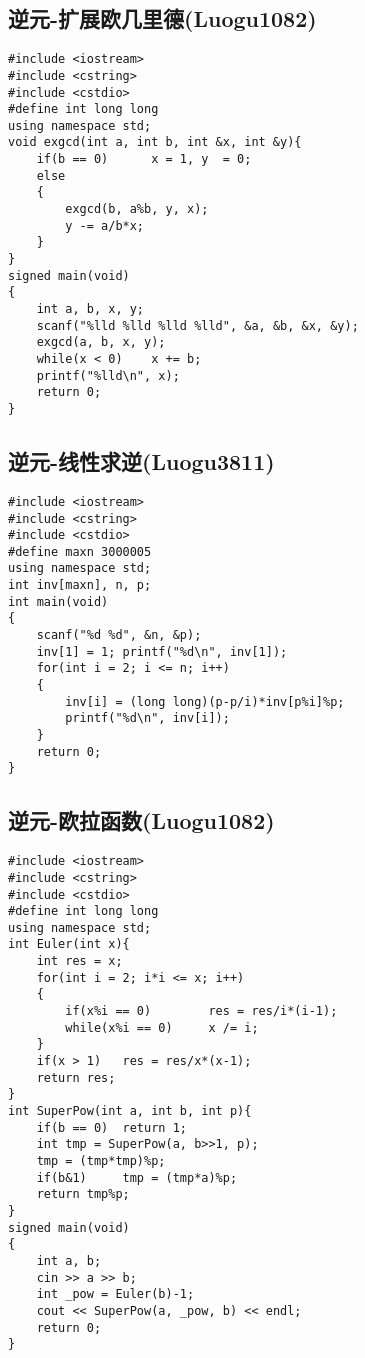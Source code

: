 \documentclass[UTF8]{ctexart}
\begin{document}
	\subsection{逆元-扩展欧几里德(Luogu1082)}
	{\setmainfont{Consolas}
\begin{lstlisting}
#include <iostream>
#include <cstring>
#include <cstdio>
#define int long long
using namespace std;
void exgcd(int a, int b, int &x, int &y){
    if(b == 0)		x = 1, y  = 0;
    else
    {
        exgcd(b, a%b, y, x);
        y -= a/b*x;
    }
}
signed main(void)
{
    int a, b, x, y;
    scanf("%lld %lld %lld %lld", &a, &b, &x, &y);
    exgcd(a, b, x, y);
    while(x < 0)	x += b;
    printf("%lld\n", x);
    return 0;
}
\end{lstlisting}}
\newpage
	\subsection{逆元-线性求逆(Luogu3811)}
	{\setmainfont{Consolas}
\begin{lstlisting}
#include <iostream>
#include <cstring>
#include <cstdio>
#define maxn 3000005
using namespace std;
int inv[maxn], n, p;
int main(void)
{
    scanf("%d %d", &n, &p);
    inv[1] = 1;	printf("%d\n", inv[1]);
    for(int i = 2; i <= n; i++)
    {
        inv[i] = (long long)(p-p/i)*inv[p%i]%p;
        printf("%d\n", inv[i]);
    }
    return 0;
}
\end{lstlisting}}
\newpage
	\subsection{逆元-欧拉函数(Luogu1082)}
	{\setmainfont{Consolas}
\begin{lstlisting}
#include <iostream>
#include <cstring>
#include <cstdio>
#define int long long
using namespace std;
int Euler(int x){
    int res = x;
    for(int i = 2; i*i <= x; i++)
    {
        if(x%i == 0)		res = res/i*(i-1);
        while(x%i == 0) 	x /= i; 
    }
    if(x > 1)	res = res/x*(x-1);
    return res;
}
int SuperPow(int a, int b, int p){
    if(b == 0)	return 1;
    int tmp = SuperPow(a, b>>1, p);
    tmp = (tmp*tmp)%p;
    if(b&1)		tmp = (tmp*a)%p;
    return tmp%p; 
}
signed main(void)
{
    int a, b;
    cin >> a >> b;
    int _pow = Euler(b)-1;
    cout << SuperPow(a, _pow, b) << endl;
    return 0;
}
\end{lstlisting}}
\newpage
\end{document}
